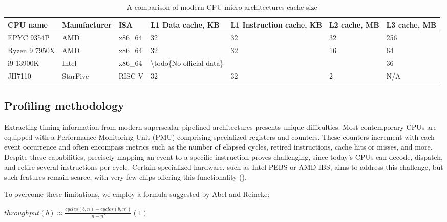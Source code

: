 \begin{table}[!t]
        \renewcommand{\arraystretch}{1.3}
        \caption{A comparison of modern CPU micro-architectures cache size}
        \centering
	\begin{tabular}{lllllll}
	        \hline
		CPU name      & Manufacturer & ISA     & L1 Data cache, KB                        & L1 Instruction cache, KB & L2 cache, MB & L3 cache, MB \\
		\hline
		EPYC 9354P    & AMD          & x86\_64 & 32                                       & 32                       & 32           & 256          \\
		Ryzen 9 7950X & AMD          & x86\_64 & 32                                       & 32                       & 16           & 64           \\
		i9-13900K     & Intel        & x86\_64 & \textbackslash{}todo\{No official data\} &                          &              & 36           \\
		JH7110        & StarFive     & RISC-V  & 32                                       & 32                       & 2            & N/A
	\end{tabular}
        \label{tab:caches}
\end{table}

\subsection{Profiling methodology}

Extracting timing information from modern superscalar pipelined architectures presents unique difficulties. Most contemporary CPUs are equipped with a Performance Monitoring Unit (PMU) comprising specialized registers and counters. These counters increment with each event occurrence and often encompass metrics such as the number of elapsed cycles, retired instructions, cache hits or misses, and more. Despite these capabilities, precisely mapping an event to a specific instruction proves challenging, since today's CPUs can decode, dispatch, and retire several instructions per cycle. Certain specialized hardware, such as Intel PEBS or AMD IBS, aims to address this challenge, but such features remain scarce, with very few chips offering this functionality ().

To overcome these limitations, we employ a formula suggested by Abel and Reineke\cite{abelUiCAAccurateThroughput2022}:

$throughput(b) \approx \frac{cycles(b, n) - cycles(b, n')}{n - n'} (1)$

